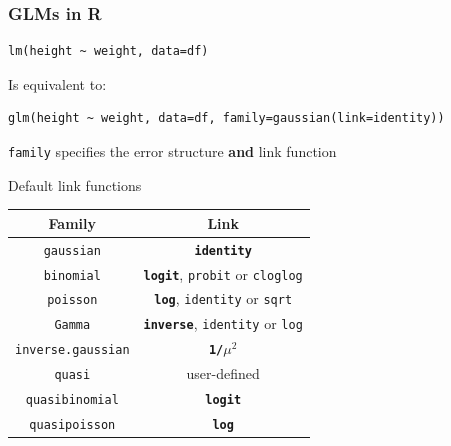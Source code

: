 \documentclass[pdf,handout]{beamer}
\begin{document}
\begin{frame}[fragile]
\frametitle{GLMs in R}


\begin{lstlisting}[style=R]
lm(height ~ weight, data=df)
\end{lstlisting}


Is equivalent to:
\vfill

\begin{lstlisting}[style=R]
glm(height ~ weight, data=df, family=gaussian(link=identity))
\end{lstlisting}

\vfill

\texttt{family} specifies the error structure \textbf{and} link function

\end{frame}

\begin{frame}{Default link functions}

\begin{longtable}[]{c|c}
\textbf{Family} & \textbf{Link}\tabularnewline\hline
\texttt{gaussian} & \textbf{\texttt{identity}}\tabularnewline
\texttt{binomial} & \textbf{\texttt{logit}}, \texttt{probit} or
\texttt{cloglog}\tabularnewline
\texttt{poisson} & \textbf{\texttt{log}}, \texttt{identity} or
\texttt{sqrt}\tabularnewline
\texttt{Gamma} & \textbf{\texttt{inverse}}, \texttt{identity} or
\texttt{log}\tabularnewline
\texttt{inverse.gaussian} & \textbf{\texttt{1/$\mu^2$}}\tabularnewline
\texttt{quasi} & user-defined\tabularnewline
\texttt{quasibinomial} & \textbf{\texttt{logit}}\tabularnewline
\texttt{quasipoisson} & \textbf{\texttt{log}}\tabularnewline
\end{longtable}

\end{frame}
\end{document}
